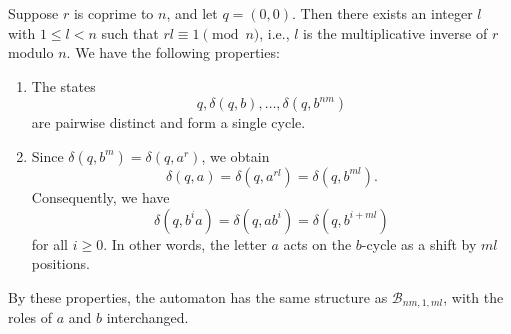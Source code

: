 \begin{remark}	
	Suppose $r$ is coprime to $n$, and let $q=(0,0)$.
	Then there exists an integer $l$ with $1 \le l < n$ such that
	$rl \equiv 1 \pmod n$, i.e., $l$ is the multiplicative inverse of $r$
	modulo $n$.
	We have the following properties:
	
	\begin{enumerate}
		\item The states
		\[
		q,\delta(q,b),\ldots,\delta(q,b^{nm})
		\]
		are pairwise distinct and form a single cycle.
		
		\item Since $\delta(q,b^m)=\delta(q,a^r)$, we obtain
		\[
		\delta(q,a)
		= \delta(q,a^{rl})
		= \delta(q,b^{ml}).
		\]
		Consequently, we have
		\[
		\delta(q,b^i a)
		= \delta(q,a b^i)
		= \delta(q,b^{i+ml})
		\]
		for all $i \ge 0$. In other words, the letter $a$ acts on the $b$-cycle
		as a shift by $ml$ positions.
	\end{enumerate}
	
	By these properties, the automaton has the same structure as
	$\mathcal B_{nm,1,ml}$, with the roles of $a$ and $b$ interchanged.	
\end{remark}

